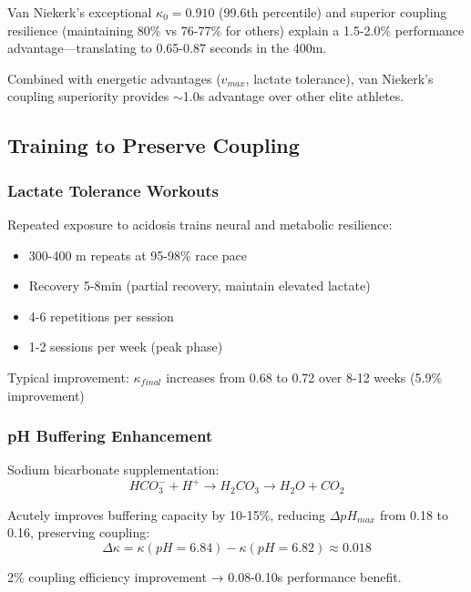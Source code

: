 Van Niekerk's exceptional $\kappa_0 = 0.910$ (99.6th percentile) and superior coupling resilience (maintaining 80\% vs 76-77\% for others) explain a 1.5-2.0\% performance advantage—translating to 0.65-0.87 seconds in the 400m.

Combined with energetic advantages ($v_{max}$, lactate tolerance), van Niekerk's coupling superiority provides $\sim$1.0s advantage over other elite athletes.

\subsection{Training to Preserve Coupling}

\subsubsection{Lactate Tolerance Workouts}

Repeated exposure to acidosis trains neural and metabolic resilience:
\begin{itemize}
    \item 300-400 m repeats at 95-98\% race pace
    \item Recovery 5-8min (partial recovery, maintain elevated lactate)
    \item 4-6 repetitions per session
    \item 1-2 sessions per week (peak phase)
\end{itemize}

Typical improvement: $\kappa_{final}$ increases from 0.68 to 0.72 over 8-12 weeks (5.9\% improvement)

\subsubsection{pH Buffering Enhancement}

Sodium bicarbonate supplementation:
\begin{equation}
HCO_3^- + H^+ \rightarrow H_2CO_3 \rightarrow H_2O + CO_2
\end{equation}

Acutely improves buffering capacity by 10-15\%, reducing $\Delta pH_{max}$ from 0.18 to 0.16, preserving coupling:
\begin{equation}
\Delta \kappa = \kappa(pH=6.84) - \kappa(pH=6.82) \approx 0.018
\end{equation}

2\% coupling efficiency improvement → 0.08-0.10s performance benefit.

